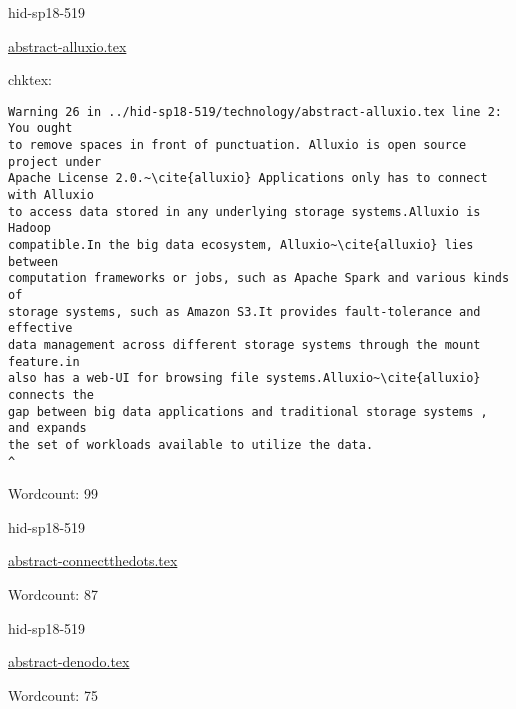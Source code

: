 \begin{IU}

hid-sp18-519

\href{https://github.com/cloudmesh-community/hid-sp18-519/blob/master//technology/abstract-alluxio.tex}{abstract-alluxio.tex}

 
chktex:
\begin{tiny}
\begin{verbatim}
Warning 26 in ../hid-sp18-519/technology/abstract-alluxio.tex line 2: You ought
to remove spaces in front of punctuation. Alluxio is open source project under
Apache License 2.0.~\cite{alluxio} Applications only has to connect with Alluxio
to access data stored in any underlying storage systems.Alluxio is Hadoop
compatible.In the big data ecosystem, Alluxio~\cite{alluxio} lies between
computation frameworks or jobs, such as Apache Spark and various kinds of
storage systems, such as Amazon S3.It provides fault-tolerance and effective
data management across different storage systems through the mount feature.in
also has a web-UI for browsing file systems.Alluxio~\cite{alluxio} connects the
gap between big data applications and traditional storage systems , and expands
the set of workloads available to utilize the data.
^
\end{verbatim}
\end{tiny}

Wordcount: 99

\end{IU}



\begin{IU}

hid-sp18-519

\href{https://github.com/cloudmesh-community/hid-sp18-519/blob/master//technology/abstract-connectthedots.tex}{abstract-connectthedots.tex}

 

Wordcount: 87

\end{IU}



\begin{IU}

hid-sp18-519

\href{https://github.com/cloudmesh-community/hid-sp18-519/blob/master//technology/abstract-denodo.tex}{abstract-denodo.tex}

 

Wordcount: 75

\end{IU}

